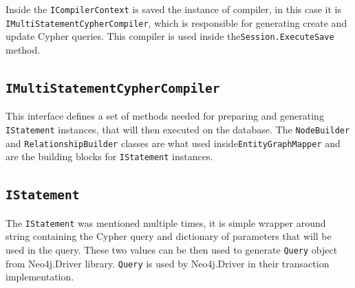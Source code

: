 Inside the \texttt{ICompilerContext} is saved the instance of compiler, in this case it is \texttt{IMultiStatementCypherCompiler},
which is responsible for generating create and update Cypher queries. This compiler is used inside the\linebreak\texttt{Session.ExecuteSave} method.

\subsection{\texttt{IMultiStatementCypherCompiler}}


This interface defines a set of methods needed for preparing and generating \texttt{IStatement} instances, that will then executed on the database.
The \texttt{NodeBuilder} and \texttt{RelationshipBuilder} classes are what used inside\linebreak\texttt{EntityGraphMapper} and are the building blocks for
\texttt{IStatement} instances.

\subsection{\texttt{IStatement}}

The \texttt{IStatement} was mentioned multiple times, it is simple wrapper around string containing the Cypher query and dictionary of parameters
that will be used in the query. These two values can be then used to generate \texttt{Query} object from Neo4j.Driver library. \texttt{Query} is used by
Neo4j.Driver in their transaction implementation.

